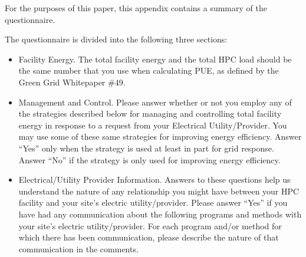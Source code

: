 For the purposes of this paper, this appendix contains a summary of the questionnaire.

The questionnaire is divided into the following three sections: 
\begin{itemize}

\item
Facility Energy. The total facility energy and the total HPC load should be the 
same number that you use when 
calculating PUE, as defined by the Green Grid Whitepaper \#49.

\item
Management and Control. 
Please answer whether or not you employ any of the strategies described below for managing 
and controlling total facility energy in response to a request from your Electrical Utility/Provider.
You may use some of these same strategies for improving energy efficiency. 
Answer ``Yes'' only when the strategy is used at least in part for grid response. 
Answer ``No'' if the strategy is only used for improving energy efficiency.

\item
Electrical/Utility Provider Information.
Answers to these questions help us understand the nature of any relationship you might have 
between your HPC facility and your site's electric utility/provider.
Please answer ``Yes'' if you have had any communication about the following programs and 
methods with your site's electric utility/provider.
For each program and/or method for which there has been communication, please describe 
the nature of that communication in the comments.
\end{itemize}

